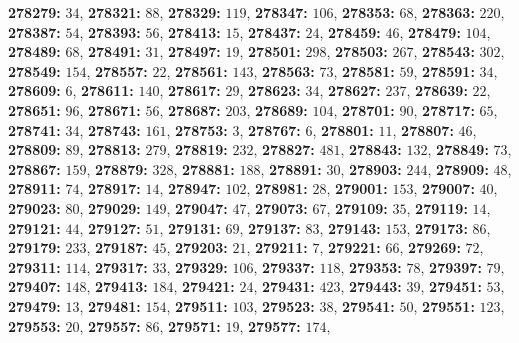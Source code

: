 \textsf{\bfseries 278279:} $34$, \textsf{\bfseries 278321:} $88$, \textsf{\bfseries 278329:} $119$, \textsf{\bfseries 278347:} $106$, \textsf{\bfseries 278353:} $68$, \textsf{\bfseries 278363:} $220$, \textsf{\bfseries 278387:} $54$, \textsf{\bfseries 278393:} $56$, \textsf{\bfseries 278413:} $15$, \textsf{\bfseries 278437:} $24$, \textsf{\bfseries 278459:} $46$, \textsf{\bfseries 278479:} $104$, \textsf{\bfseries 278489:} $68$, \textsf{\bfseries 278491:} $31$, \textsf{\bfseries 278497:} $19$, \textsf{\bfseries 278501:} $298$, \textsf{\bfseries 278503:} $267$, \textsf{\bfseries 278543:} $302$, \textsf{\bfseries 278549:} $154$, \textsf{\bfseries 278557:} $22$, \textsf{\bfseries 278561:} $143$, \textsf{\bfseries 278563:} $73$, \textsf{\bfseries 278581:} $59$, \textsf{\bfseries 278591:} $34$, \textsf{\bfseries 278609:} $6$, \textsf{\bfseries 278611:} $140$, \textsf{\bfseries 278617:} $29$, \textsf{\bfseries 278623:} $34$, \textsf{\bfseries 278627:} $237$, \textsf{\bfseries 278639:} $22$, \textsf{\bfseries 278651:} $96$, \textsf{\bfseries 278671:} $56$, \textsf{\bfseries 278687:} $203$, \textsf{\bfseries 278689:} $104$, \textsf{\bfseries 278701:} $90$, \textsf{\bfseries 278717:} $65$, \textsf{\bfseries 278741:} $34$, \textsf{\bfseries 278743:} $161$, \textsf{\bfseries 278753:} $3$, \textsf{\bfseries 278767:} $6$, \textsf{\bfseries 278801:} $11$, \textsf{\bfseries 278807:} $46$, \textsf{\bfseries 278809:} $89$, \textsf{\bfseries 278813:} $279$, \textsf{\bfseries 278819:} $232$, \textsf{\bfseries 278827:} $481$, \textsf{\bfseries 278843:} $132$, \textsf{\bfseries 278849:} $73$, \textsf{\bfseries 278867:} $159$, \textsf{\bfseries 278879:} $328$, \textsf{\bfseries 278881:} $188$, \textsf{\bfseries 278891:} $30$, \textsf{\bfseries 278903:} $244$, \textsf{\bfseries 278909:} $48$, \textsf{\bfseries 278911:} $74$, \textsf{\bfseries 278917:} $14$, \textsf{\bfseries 278947:} $102$, \textsf{\bfseries 278981:} $28$, \textsf{\bfseries 279001:} $153$, \textsf{\bfseries 279007:} $40$, \textsf{\bfseries 279023:} $80$, \textsf{\bfseries 279029:} $149$, \textsf{\bfseries 279047:} $47$, \textsf{\bfseries 279073:} $67$, \textsf{\bfseries 279109:} $35$, \textsf{\bfseries 279119:} $14$, \textsf{\bfseries 279121:} $44$, \textsf{\bfseries 279127:} $51$, \textsf{\bfseries 279131:} $69$, \textsf{\bfseries 279137:} $83$, \textsf{\bfseries 279143:} $153$, \textsf{\bfseries 279173:} $86$, \textsf{\bfseries 279179:} $233$, \textsf{\bfseries 279187:} $45$, \textsf{\bfseries 279203:} $21$, \textsf{\bfseries 279211:} $7$, \textsf{\bfseries 279221:} $66$, \textsf{\bfseries 279269:} $72$, \textsf{\bfseries 279311:} $114$, \textsf{\bfseries 279317:} $33$, \textsf{\bfseries 279329:} $106$, \textsf{\bfseries 279337:} $118$, \textsf{\bfseries 279353:} $78$, \textsf{\bfseries 279397:} $79$, \textsf{\bfseries 279407:} $148$, \textsf{\bfseries 279413:} $184$, \textsf{\bfseries 279421:} $24$, \textsf{\bfseries 279431:} $423$, \textsf{\bfseries 279443:} $39$, \textsf{\bfseries 279451:} $53$, \textsf{\bfseries 279479:} $13$, \textsf{\bfseries 279481:} $154$, \textsf{\bfseries 279511:} $103$, \textsf{\bfseries 279523:} $38$, \textsf{\bfseries 279541:} $50$, \textsf{\bfseries 279551:} $123$, \textsf{\bfseries 279553:} $20$, \textsf{\bfseries 279557:} $86$, \textsf{\bfseries 279571:} $19$, \textsf{\bfseries 279577:} $174$, 
